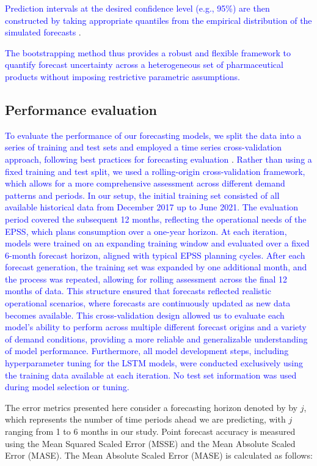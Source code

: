 \documentclass[
  authoryear,
  preprint,
  3p]{elsarticle}
\begin{document}
\textcolor{blue}{Prediction intervals at the desired confidence level (e.g., 95\%) are then constructed by taking appropriate quantiles from the empirical distribution of the simulated forecasts}
\citep{hyndman2021forecasting}.

\textcolor{blue}{The bootstrapping method thus provides a robust and flexible framework to quantify forecast uncertainty across a heterogeneous set of pharmaceutical products without imposing restrictive parametric assumptions.}

\subsection{Performance evaluation}\label{performance-evaluation}

\textcolor{blue}{To evaluate the performance of our forecasting models, we split the data into a series of training and test sets and employed a time series cross-validation approach, following best practices for forecasting evaluation}
\citep{hyndman2021forecasting}.
\textcolor{blue}{Rather than using a fixed training and test split, we used a rolling-origin cross-validation framework, which allows for a more comprehensive assessment across different demand patterns and periods. In our setup, the initial training set consisted of all available historical data from December 2017 up to June 2021. The evaluation period covered the subsequent 12 months, reflecting the operational needs of the EPSS, which plans consumption over a one-year horizon. At each iteration, models were trained on an expanding training window and evaluated over a fixed 6-month forecast horizon, aligned with typical EPSS planning cycles. After each forecast generation, the training set was expanded by one additional month, and the process was repeated, allowing for rolling assessment across the final 12 months of data. This structure ensured that forecasts reflected realistic operational scenarios, where forecasts are continuously updated as new data becomes available. This cross-validation design allowed us to evaluate each model's ability to perform across multiple different forecast origins and a variety of demand conditions, providing a more reliable and generalizable understanding of model performance. Furthermore, all model development steps, including hyperparameter tuning for the LSTM models, were conducted exclusively using the training data available at each iteration. No test set information was used during model selection or tuning.}

The error metrics presented here consider a forecasting horizon denoted
by by \(j\), which represents the number of time periods ahead we are
predicting, with \(j\) ranging from 1 to 6 months in our study. Point
forecast accuracy is measured using the Mean Squared Scaled Error (MSSE)
and the Mean Absolute Scaled Error (MASE). The Mean Absolute Scaled
Error (MASE) \citep{HK06, hyndman2021forecasting} is calculated as
follows:
\end{document}
